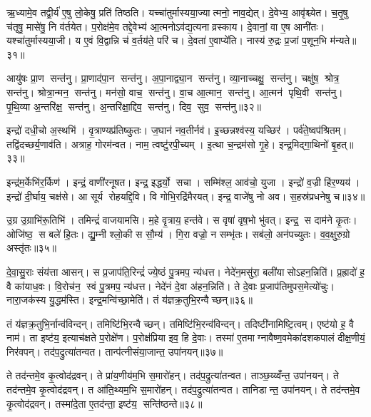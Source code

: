 ऋ॒ध्यामे॒व तद्वी॒र्य॑ ए॒षु लो॒केषु॒ प्रति॑ तिष्ठति।
यच्चा॑तुर्मास्यया॒ज्यात्मनो॒ नाव॒द्येत्।
दे॒वेभ्य॒ आवृ॑श्च्येत।
च॒तृ॒षु च॑तृषु॒ मासे॑षु॒ नि व॑र्तयेत।
प॒रोक्ष॑मे॒व तद्दे॒वेभ्य॑ आ॒त्मनोऽव॑द्य॒त्यनाव्रस्काय।
दे॒वानां॒ वा ए॒ष आनी॑तः।
यश्चा॑तुर्मास्यया॒जी।
य ए॒वं वि॒द्वान्नि च॑ व॒र्तय॑ते॒ परि॑ च।
दे॒वता॑ ए॒वाप्ये॑ति।
नास्य॑ रु॒द्रः प्र॒जां प॒शून॒भि म॑न्यते॥३१॥\anuvakamend[ए॒त्ये॒त्य॒यु॒ञ्ज॒तासु॑रा एति लो॒का म॑न्यते]

आयु॑षः प्रा॒ण सन्त॑नु।
प्रा॒णाद॑पा॒न सन्त॑नु।
अ॒पा॒नाद्व्या॒न सन्त॑नु।
व्या॒नाच्चक्षु॒ सन्त॑नु।
चक्षु॑ष॒ श्रोत्र॒ सन्त॑नु।
श्रोत्रा॒न्मन॒ सन्त॑नु।
मन॑सो॒ वाच॒ सन्त॑नु।
वा॒च आ॒त्मान॒ सन्त॑नु।
आ॒त्मन॑ पृथि॒वी सन्त॑नु।
पृ॒थि॒व्या अ॒न्तरि॑क्ष॒ सन्त॑नु।
अ॒न्तरि॑क्षा॒द्दिव॒ सन्त॑नु।
दिव॒ सुव॒ सन्त॑नु॥३२॥\anuvakamend[अ॒न्तरि॑क्ष॒ सन्त॑नु॒ द्वे च॑]

इन्द्रो॑ दधी॒चो अ॒स्थभि॑।
वृ॒त्राण्यप्र॑तिष्कुतः।
ज॒घान॑ नव॒तीर्नव॑।
इ॒च्छन्नश्व॑स्य॒ यच्छिर॑।
पर्व॑ते॒ष्वप॑श्रितम्।
तद्वि॑दच्छर्य॒णाव॑ति।
अत्राह॒ गोरम॑न्वत।
नाम॒ त्वष्टु॑रपी॒च्यम्।
इ॒त्था च॒न्द्रम॑सो गृ॒हे।
इन्द्र॒मिद्गा॒थिनो॑ बृ॒हत्॥३३॥

इन्द्र॑म॒र्केभि॑र॒र्किण॑।
इन्द्रं॒ वाणी॑रनूषत।
इन्द्र॒ इद्धर्यो॒ सचा।
सम्मि॑श्ल॒ आव॑चो॒ युजा।
इन्द्रो॑ व॒ज्री हि॑र॒ण्यय॑।
इन्द्रो॑ दी॒र्घाय॒ चक्ष॑से।
आ सूर्य रोहयद्दि॒वि।
वि गोभि॒रद्रि॑मैरयत्।
इन्द्र॒ वाजे॑षु नो अव।
स॒हस्र॑प्रधनेषु च॥३४॥

उ॒ग्र उ॒ग्राभि॑रू॒तिभि॑।
तमिन्द्रं॑ वाजयामसि।
म॒हे वृ॒त्राय॒ हन्त॑वे।
स वृषा॑ वृष॒भो भु॑वत्।
इन्द्र॒ स दाम॑ने कृ॒तः।
ओजि॑ष्ठ॒ स बले॑ हि॒तः।
द्यु॒म्नी श्लो॒की स सौ॒म्य॑।
गि॒रा वज्रो॒ न सम्भृ॑तः।
सब॑लो॒ अन॑पच्युतः।
व॒व॒क्षुरु॒ग्रो अस्तृ॑तः॥३५॥\anuvakamend[बृ॒हच्चास्तृ॑तः]

दे॒वा॒सु॒राः संय॑त्ता आसन्।
स प्र॒जाप॑ति॒रिन्द्रं॑ ज्ये॒ष्ठं पु॒त्रमप॒ न्य॑धत्त।
नेदे॑न॒मसु॑रा॒ बली॑यासोऽहन॒न्निति॑।
प्र॒ह्रादो॑ ह॒ वै का॑याध॒वः।
वि॒रोच॑न॒ स्वं पु॒त्रमप॒ न्य॑धत्त।
नेदे॑नं दे॒वा अ॑हन॒न्निति॑।
ते दे॒वाः प्र॒जाप॑तिमुपस॒मेत्यो॑चुः।
नारा॒जक॑स्य यु॒द्धम॑स्ति।
इन्द्र॒मन्वि॑च्छा॒मेति॑।
तं य॑ज्ञक्र॒तुभि॒रन्वैच्छन्॥३६॥

तं य॑ज्ञक्र॒तुभि॒र्नान्व॑विन्दन्।
तमिष्टि॑भि॒रन्वैच्छन्।
तमिष्टि॑भि॒रन्व॑विन्दन्।
तदिष्टी॑नामिष्टि॒त्वम्।
एष्ट॑यो ह॒ वै नाम॑।
ता इष्ट॑य॒ इत्याच॑क्षते प॒रोक्षे॑ण।
प॒रोक्ष॑प्रिया इव॒ हि दे॒वाः।
तस्मा॑ ए॒तमाग्नावैष्ण॒वमेका॑दशकपालं दीक्ष॒णीयं॒ निर॑वपन्।
तद॑प॒द्रुत्या॑तन्वत।
तान्प॑त्नीसंया॒जान्त॒ उपा॑नयन्॥३७॥

ते तद॑न्तमे॒व कृ॒त्वोद॑द्रवन्।
ते प्रा॑य॒णीय॑म॒भि स॒मारो॑हन्।
तद॑प॒द्रुत्या॑तन्वत।
ताञ्छ॒य्य्वँ॑न्त॒ उपा॑नयन्।
ते तद॑न्तमे॒व कृ॒त्वोद॑द्रवन्।
त आ॑ति॒थ्यम॒भि स॒मारो॑हन्।
तद॑प॒द्रुत्या॑तन्वत।
तानिडान्त॒ उपा॑नयन्।
ते तद॑न्तमे॒व कृ॒त्वोद॑द्रवन्।
तस्मा॑दे॒ता ए॒तद॑न्ता॒ इष्ट॑य॒ सन्ति॑ष्ठन्ते॥३८॥

